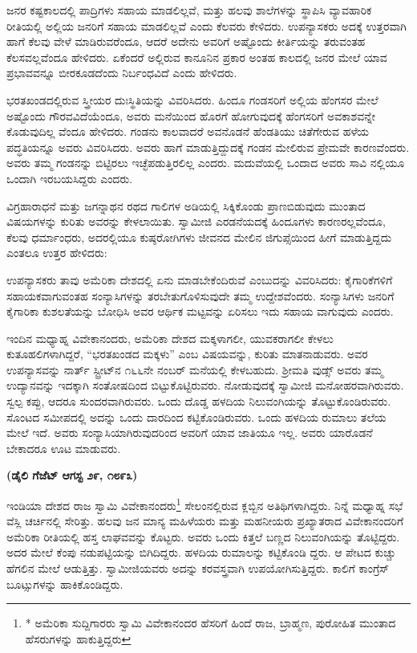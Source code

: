 ಜನರ ಕಷ್ಟಕಾಲದಲ್ಲಿ ಪಾದ್ರಿಗಳು ಸಹಾಯ ಮಾಡಲಿಲ್ಲವೆ, ಮತ್ತು ಹಲವು ಶಾಲೆಗಳನ್ನು ಸ್ಥಾಪಿಸಿ ವ್ಯಾವಹಾರಿಕ ರೀತಿಯಲ್ಲಿ ಅಲ್ಲಿಯ ಜನರಿಗೆ ಸಹಾಯ ಮಾಡಲಿಲ್ಲವೆ ಎಂದು ಕೆಲವರು ಕೇಳಿದರು. ಉಪನ್ಯಾಸಕರು ಅದಕ್ಕೆ ಉತ್ತರವಾಗಿ ಹಾಗೆ ಕೆಲವು ವೇಳೆ ಮಾಡಿರುವರೆಂದೂ, ಆದರೆ ಅದೇನು ಅವರಿಗೆ ಅಷ್ಟೊಂದು ಕೀರ್ತಿಯನ್ನು ತರುವಂತಹ ಕೆಲಸವಲ್ಲವೆಂದೂ ಹೇಳಿದರು. ಏಕೆಂದರೆ ಅಲ್ಲಿರುವ ಕಾನೂನಿನ ಪ್ರಕಾರ ಅಂತಹ ಕಾಲದಲ್ಲಿ ಜನರ ಮೇಲೆ ಯಾವ ಪ್ರಭಾವವನ್ನೂ ಬೀರಕೂಡದೆಂದು ನಿರ್ಬಂಧವಿದೆ ಎಂದು ಹೇಳಿದರು.

ಭರತಖಂಡದಲ್ಲಿರುವ ಸ್ತ್ರೀಯರ ದುಃಸ್ಥಿತಿಯನ್ನು ವಿವರಿಸಿದರು. ಹಿಂದೂ ಗಂಡಸರಿಗೆ ಅಲ್ಲಿಯ ಹೆಂಗಸರ ಮೇಲೆ ಅಷ್ಟೊಂದು ಗೌರವವಿದೆಯೆಂದೂ, ಅವರು ಮನೆಯಿಂದ ಹೊರಗೆ ಹೋಗುವುದಕ್ಕೆ ಹೆಂಗಸರಿಗೆ ಅವಕಾಶವನ್ನೇ ಕೊಡುವುದಿಲ್ಲ ವೆಂದೂ ಹೇಳಿದರು. ಗಂಡನು ಕಾಲವಾದರೆ ಅವನೊಡನೆ ಹೆಂಡತಿಯು ಚಿತೆಗೇರುವ ಹಳೆಯ ಪದ್ಧತಿಯನ್ನೂ ಅವರು ವಿವರಿಸಿದರು. ಅವರು ಹಾಗೆ ಮಾಡುತ್ತಿದ್ದುದಕ್ಕೆ ಗಂಡನ ಮೇಲಿರುವ ಪ್ರೇಮವೇ ಕಾರಣವೆಂದರು. ಅವರು ತಮ್ಮ ಗಂಡನನ್ನು ಬಿಟ್ಟಿರಲು ಇಚ್ಛೆಪಡುತ್ತಿರಲಿಲ್ಲ ಎಂದರು. ಮದುವೆಯಲ್ಲಿ ಒಂದಾದ ಅವರು ಸಾವಿ ನಲ್ಲಿಯೂ ಒಂದಾಗಿ ಇರಬಯಸಿದ್ದರು ಎಂದರು.

ವಿಗ್ರಹಾರಾಧನೆ ಮತ್ತು ಜಗನ್ನಾಥನ ರಥದ ಗಾಲಿಗಳ ಅಡಿಯಲ್ಲಿ ಸಿಕ್ಕಿಕೊಂಡು ಪ್ರಾಣಬಿಡುವುದು ಮುಂತಾದ ವಿಷಯಗಳನ್ನು ಕುರಿತು ಅವರನ್ನು ಕೇಳಲಾಯಿತು. ಸ್ವಾಮೀಜಿ ಎರಡನೆಯದಕ್ಕೆ ಹಿಂದೂಗಳು ಕಾರಣರಲ್ಲವೆಂದೂ, ಕೆಲವು ಧರ್ಮಾಂಧರು, ಅದರಲ್ಲಿಯೂ ಕುಷ್ಠರೋಗಿಗಳು ಜೀವನದ ಮೇಲಿನ ಜಿಗುಪ್ಸೆಯಿಂದ ಹೀಗೆ ಮಾಡುತ್ತಿದ್ದದು ಎಂತಲೂ ಉತ್ತರ ಹೇಳಿದರು:

ಉಪನ್ಯಾಸಕರು ತಾವು ಅಮೆರಿಕಾ ದೇಶದಲ್ಲಿ ಏನು ಮಾಡಬೇಕೆಂದಿರುವೆ ಎಂಬುದನ್ನು ವಿವರಿಸಿದರು: ಕೈಗಾರಿಕೆಗಳಿಗೆ ಸಹಾಯಕವಾಗುವಂತಹ ಸಂನ್ಯಾಸಿಗಳನ್ನು ತರಬೇತುಗೊಳಿಸುವುದೇ ತಮ್ಮ ಉದ್ದೇಶವೆಂದರು. ಸಂನ್ಯಾಸಿಗಳು ಜನರಿಗೆ ಕೈಗಾರಿಕಾ ಕುಶಲತೆಯನ್ನು ಬೋಧಿಸಿ ಅವರ ಆರ್ಥಿಕ ಮಟ್ಟವನ್ನು ಏರಿಸಲು ಇದು ಸಹಾಯ ವಾಗುವುದು ಎಂದರು.

ಇಂದಿನ ಮಧ್ಯಾಹ್ನ ವಿವೇಕಾನಂದರು, ಅಮೆರಿಕಾ ದೇಶದ ಮಕ್ಕಳಾಗಲೀ, ಯುವಕರಾಗಲೀ ಕೇಳಲು ಕುತೂಹಲಿಗಳಾಗಿದ್ದರೆ, “ಭರತಖಂಡದ ಮಕ್ಕಳು” ಎಂಬ ವಿಷಯವನ್ನು, ಕುರಿತು ಮಾತನಾಡುವರು. ಅವರ ಉಪನ್ಯಾಸವನ್ನು ನಾರ್ತ್​ ಸ್ಟ್ರೀಟ್​ನ ೧೬೬ನೇ ನಂಬರ್​ ಮನೆಯಲ್ಲಿ ಕೇಳಬಹುದು. ಶ‍್ರೀಮತಿ ವುಡ್ಸ್​ ಅವರು ತಮ್ಮ ಉದ್ಯಾನವನ್ನು ಇದಕ್ಕಾಗಿ ಸಂತೋಷದಿಂದ ಬಿಟ್ಟುಕೊಟ್ಟಿರುವರು. ನೋಡುವುದಕ್ಕೆ ಸ್ವಾಮೀಜಿ ಮನೋಹರವಾಗಿರುವರು. ಸ್ವಲ್ಪ ಕಪ್ಪು, ಆದರೂ ಸುಂದರವಾಗಿರುವರು. ಒಂದು ದೊಡ್ಡ ಹಳದಿಯ ನಿಲುವಂಗಿಯನ್ನು ತೊಟ್ಟುಕೊಂಡಿರುವರು. ಸೊಂಟದ ಸಮೀಪದಲ್ಲಿ ಅದನ್ನು ಒಂದು ದಾರದಿಂದ ಕಟ್ಟಿಕೊಂಡಿರುವರು. ಒಂದು ಹಳದಿಯ ರುಮಾಲು ತಲೆಯ ಮೇಲೆ ಇದೆ. ಅವರು ಸಂನ್ಯಾಸಿಯಾಗಿರುವುದರಿಂದ ಅವರಿಗೆ ಯಾವ ಜಾತಿಯೂ ಇಲ್ಲ. ಅವರು ಯಾರೊಡನೆ ಬೇಕಾದರೂ ಊಟ ಮಾಡುವರು.

\begin{center}
\textbf{(ಡೈಲಿ ಗೆಜೆಟ್​ ಆಗಸ್ಟ ೨೯, ೧೮೯೩)}
\end{center}

ಇಂಡಿಯಾ ದೇಶದ ರಾಜ ಸ್ವಾಮಿ ವಿವೇಕಾನಂದರು\footnote{* ಅಮೆರಿಕಾ ಸುದ್ದಿಗಾರರು ಸ್ವಾಮಿ ವಿವೇಕಾನಂದರ ಹೆಸರಿಗೆ ಹಿಂದೆ ರಾಜ, ಬ್ರಾಹ್ಮಣ, ಪುರೋಹಿತ ಮುಂತಾದ ಹೆಸರುಗಳನ್ನು ಹಾಕುತ್ತಿದ್ದರು} ಸೇಲಂನಲ್ಲಿರುವ  ಕ್ಲಬ್ಬಿನ ಅತಿಥಿಗಳಾಗಿದ್ದರು. ನಿನ್ನೆ ಮಧ್ಯಾಹ್ನ ಸಭೆ ವೆಸ್ಲಿ ಚರ್ಚಿನಲ್ಲಿ ಸೇರಿತ್ತು. ಹಲವು ಜನ ಮಾನ್ಯ ಮಹಿಳೆಯರು ಮತ್ತು ಮಹನೀಯರು ಪ್ರಖ್ಯಾತರಾದ ವಿವೇಕಾನಂದರಿಗೆ ಅಮೆರಿಕಾ ರೀತಿಯಲ್ಲಿ ಹಸ್ತ ಲಾಘವವನ್ನು ಕೊಟ್ಟರು. ಅವರು ಒಂದು ಕಿತ್ತಲೆ ಬಣ್ಣದ ನಿಲುವಂಗಿಯನ್ನು ತೊಟ್ಟಿದ್ದರು. ಅದರ ಮೇಲೆ ಕೆಂಪು ನಡುಪಟ್ಟಿಯನ್ನು ಬಿಗಿದಿದ್ದರು. ಹಳದಿಯ ರುಮಾಲನ್ನು ಕಟ್ಟಿಕೊಂಡಿ ದ್ದರು. ಆ ಪೇಟದ ಕುಚ್ಚು ಹೆಗಲಿನ ಮೇಲೆ ಆಡುತ್ತಿತ್ತು. ಸ್ವಾಮೀಜಿಯವರು ಅದನ್ನು ಕರವಸ್ತ್ರವಾಗಿ ಉಪಯೋಗಿಸುತ್ತಿದ್ದರು. ಕಾಲಿಗೆ ಕಾಂಗ್ರೆಸ್​ ಬೂಟ್ಸುಗಳನ್ನು ಹಾಕಿಕೊಂಡಿದ್ದರು.

